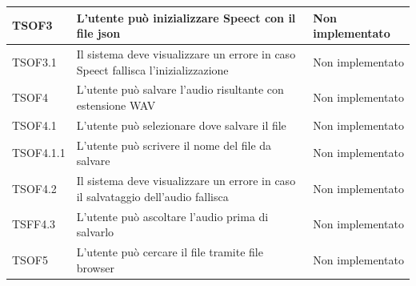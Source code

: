 \documentclass[openany,12pt,a4paper]{report}
\begin{document}
\begin{longtable}{| p{2cm} |p{5cm} | p{2.5cm} |}
	\newline TSOF3&		
	\newline L'utente può inizializzare Speect con il file json&
	\newline Non implementato
	\\[1em]	
	\hline	
	
	\newline TSOF3.1&
	\newline Il sistema deve visualizzare un errore in caso Speect fallisca l'inizializzazione&
	\newline Non implementato
	\\[1em]		
	\hline
	
	\newline TSOF4&
	\newline L'utente può salvare l'audio risultante con estensione WAV&
	\newline Non implementato
	\\[1em]
	\hline
	
	\newline TSOF4.1&
	\newline L'utente può selezionare dove salvare il file&
	\newline Non implementato
	\\[1em]
	
	\hline	
	\newline TSOF4.1.1&
	\newline L'utente può scrivere il nome del file da salvare&
	\newline Non implementato
	\\[1em]
	
	\hline
	\newline TSOF4.2&
	\newline Il sistema deve visualizzare un errore in caso il salvataggio dell'audio fallisca&
	\newline Non implementato
	\\[1em]
	\hline
	
	\newline TSFF4.3&
	\newline L'utente può ascoltare l'audio prima di salvarlo&
	\newline Non implementato
	\\[1em]
	\hline
	
	\newline TSOF5&
	\newline L'utente può cercare il file tramite file browser&
	\newline Non implementato
	\\[1em]
	\hline
	

\end{longtable}
\end{document}
